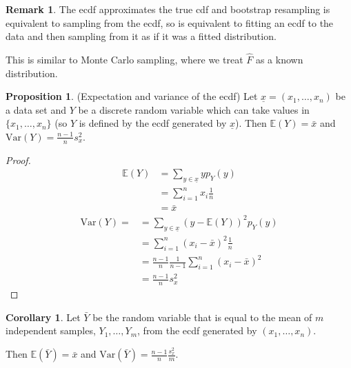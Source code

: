 \documentclass[12pt,a4paper]{article}
\theoremstyle{definition}
\newtheorem{proposition}[definition]{Proposition}
\newtheorem{corollary}[definition]{Corollary}
\newtheorem*{remark}{Remark}
\begin{document}
\begin{remark}
	The ecdf approximates the true cdf and bootstrap resampling is equivalent to sampling from the ecdf, so is equivalent to fitting an ecdf to the data and then sampling from it as if it was a fitted distribution.

	This is similar to Monte Carlo sampling, where we treat $\hat{F}$ as a known distribution.
\end{remark}

\begin{proposition}
	(Expectation and variance of the ecdf) Let $\underline{x} = (x_1, \dots, x_n)$ be a data set and $Y$ be a discrete random variable which can take values in $\{ x_1, \dots, x_n \}$ (so $Y$ is defined by the ecdf generated by $\underline{x}$). Then $\mathbb{E}(Y) = \bar{x}$ and $\text{Var}(Y) = \frac{n - 1}{n} s_x^2$.
\end{proposition}

\begin{proof}
	\[
		\begin{aligned}
			\mathbb{E}(Y)
				& = \sum_{y \in \underline{x}} y p_Y(y) \\
				& = \sum_{i = 1}^n x_i \frac{1}{n} \\
				& = \bar{x}
		\end{aligned}
	\]
	\[
		\begin{aligned}
			\text{Var}(Y) =
				& = \sum_{y \in \underline{x}} {(y - \mathbb{E}(Y))}^2 p_Y(y) \\
				& = \sum_{i = 1}^n {(x_i - \bar{x})}^2 \frac{1}{n} \\
				& = \frac{n - 1}{n} \frac{1}{n - 1} \sum_{i = 1}^n {(x_i - \bar{x})}^2 \\
				& = \frac{n - 1}{n} s_x^2
		\end{aligned}
	\]
\end{proof}

\begin{corollary}\label{cor:ecdfExpectationAndVariance}
	Let $\bar{Y}$ be the random variable that is equal to the mean of $m$ independent samples, $Y_1, \dots, Y_m$, from the ecdf generated by $(x_1, \dots, x_n)$.

	Then $\mathbb{E}(\bar{Y}) = \bar{x}$ and $\text{Var}(\bar{Y}) = \frac{n - 1}{n} \frac{s_x^2}{m}$.
\end{corollary}
\end{document}
